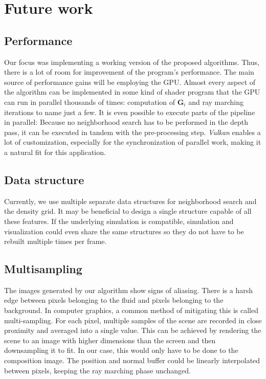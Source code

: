 %
\chapter{Future work}
\label{sec:futurework}

\section{Performance}

Our focus was implementing a working version of the proposed algorithms. Thus, there is a lot of room for improvement of the program's performance. The main source of performance gains will be employing the GPU. Almost every aspect of the algorithm can be implemented in some kind of shader program that the GPU can run in parallel thousands of times: computation of $\textbf{G}_i$ and ray marching iterations to name just a few. It is even possible to execute parts of the pipeline in parallel: Because no neighborhood search has to be performed in the depth pass, it can be executed in tandem with the pre-processing step. \textit{Vulkan} enables a lot of customization, especially for the synchronization of parallel work, making it a natural fit for this application.

\section{Data structure}

Currently, we use multiple separate data structures for neighborhood search and the density grid. It may be beneficial to design a single structure capable of all these features. If the underlying simulation is compatible, simulation and visualization could even share the same structures so they do not have to be rebuilt multiple times per frame.

\section{Multisampling}

The images generated by our algorithm show signs of aliasing. There is a harsh edge between pixels belonging to the fluid and pixels belonging to the background. In computer graphics, a common method of mitigating this is called multi-sampling. For each pixel, multiple samples of the scene are recorded in close proximity and averaged into a single value. This can be achieved by rendering the scene to an image with higher dimensions than the screen and then downsampling it to fit. In our case, this would only have to be done to the composition image. The position and normal buffer could be linearly interpolated between pixels, keeping the ray marching phase unchanged.

